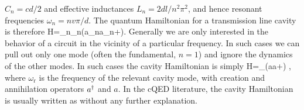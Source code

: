 $C_n=c d/2$ and effective inductances $L_n=2 d l/n^2\pi^2$, and hence resonant frequencies $\omega_n=n v\pi/d$. The quantum Hamiltonian for a transmission line cavity is therefore
\be
    \label{eq:mmcavham}
    H=\hbar\sum_{n}\omega_n\left(a_n\dg a_n\pdg+\right).
\ee
Generally we are only interested in the behavior of a circuit in the vicinity of a particular frequency. In such cases we can pull out only one mode (often the fundamental, $n=1$) and ignore the dynamics of the other modes. In such cases the cavity Hamiltonian is simply
\be
    \label{eq:smcavham}
    H=\hbar\omega_{}\left(a\dg a+\right) ,
\ee
where $\omega_\text{r}$ is the frequency of the relevant cavity mode, with creation and annihilation operators $a^{\dag}$ and $a$. In the cQED literature, the cavity Hamiltonian is usually written as  without any further explanation.%
%
%

%
%
%

